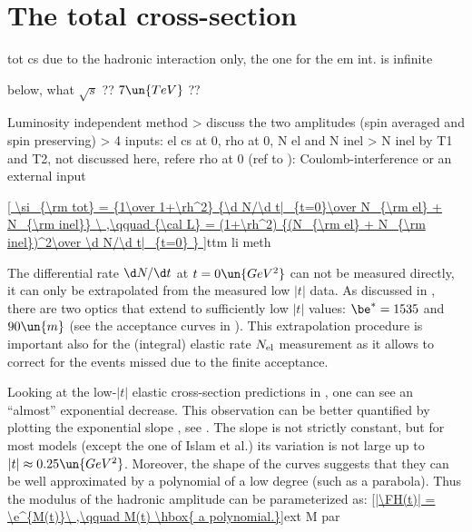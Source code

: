 \section[ttm tcs]{The total cross-section}

\> tot cs due to the hadronic interaction only, the one for the em int. is infinite


\> below, what $\sqrt s$ ?? $7\un{TeV}$ ??

\> Luminosity independent method
\>> discuss the two amplitudes (spin averaged and spin preserving)
\>> 4 inputs: el cs at 0, rho at 0, N el and N inel
\>> N inel by T1 and T2, not discussed here, refere
\> rho at 0 (ref to ): Coulomb-interference or an external input

\eqref{
	\si_{\rm tot} = {1\over 1+\rh^2} {\d N/\d t|_{t=0}\over N_{\rm el} + N_{\rm inel}}
	\ ,\qquad
	{\cal L} = (1+\rh^2) {(N_{\rm el} + N_{\rm inel})^2\over \d N/\d t|_{t=0} }
}{ttm li meth}

The differential rate $\d N/\d t$ at $t=0\un{GeV^2}$ can not be measured directly, it can only be extrapolated from the measured low $|t|$ data. As discussed in , there are two optics that extend to sufficiently low $|t|$ values: $\be^* = 1535$ and $90\un{m}$ (see the acceptance curves in ). This extrapolation procedure is important also for the (integral) elastic rate $N_{\rm el}$ measurement as it allows to correct for the events missed due to the finite acceptance.

Looking at the low-$|t|$ elastic cross-section predictions in , one can see an ``almost'' exponential decrease. This observation can be better quantified by plotting the exponential slope , see . The slope is not strictly constant, but for most models (except the one of Islam et al.) its variation is not large up to $|t| \approx 0.25\un{GeV^2}$. Moreover, the shape of the curves suggests that they can be well approximated by a polynomial of a low degree (such as a parabola). Thus the modulus of the hadronic amplitude can be parameterized as:
\eqref{|\FH(t)| = \e^{M(t)}\ ,\qquad M(t) \hbox{ a polynomial.}}{ext M par}

